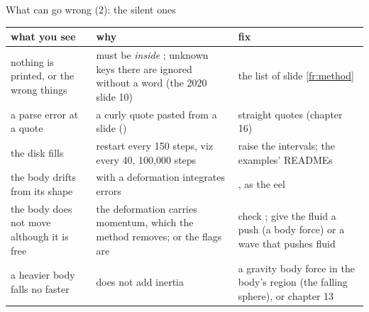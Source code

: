 \documentclass[aspectratio=169,11pt]{beamer}
\begin{document}
\begin{frame}{What can go wrong (2): the silent ones}
\label{fr:wrong2}
\scriptsize
\setlength{\tabcolsep}{3pt}
\begin{tabular}{@{}L{0.3\textwidth}L{0.38\textwidth}L{0.26\textwidth}@{}}
\toprule
what you see & why & fix\\
\midrule
nothing is printed, or the wrong things &  must be \emph{inside} ; unknown keys there are ignored without a word (the 2020 slide 10) & the list of slide \ref{fr:method}\\
a parse error at a quote & a curly quote pasted from a slide () & straight quotes (chapter 16)\\
the disk fills & restart every 150 steps, viz every 40, 100,000 steps & raise the intervals; the examples' READMEs\\
the body drifts from its shape &  with a deformation integrates errors & , as the eel\\
the body does not move although it is free & the deformation carries momentum, which the method removes; or the flags are  & check ; give the fluid a push (a body force) or a wave that pushes fluid\\
a heavier body falls no faster &  does not add inertia & a gravity body force in the body's region (the falling sphere), or chapter 13\\
\bottomrule
\end{tabular}
\end{frame}
\end{document}
